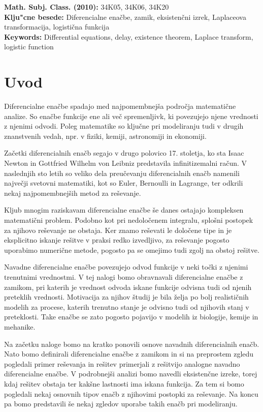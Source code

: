 \documentclass[12pt,a4paper]{amsart}
\theoremstyle{definition} %
\theoremstyle{plain} %
\begin{document}
\vfill\noindent
{\bf Math. Subj. Class. (2010):} 34K05, 34K06, 34K20  \\[1mm]  
{\bf Klju"cne besede:} Diferencialne enačbe, zamik, eksistenčni izrek, Laplaceova transformacija, logistična funkcija  \\[1mm]  
{\bf Keywords:} Dif\mbox{}ferential equations, delay, existence theorem, Laplace transform, logistic function
\pagebreak



\section{Uvod}

Diferencialne enačbe spadajo med najpomembnejša področja matematične analize. So enačbe funkcije ene ali več
spremenljivk, ki povezujejo njene vrednosti z njenimi odvodi. Poleg matematike so ključne pri modeliranju tudi v drugih
znanstvenih vedah, npr. v fiziki, kemiji, astronomiji in ekonomiji.

Začetki diferencialnih enačb segajo v drugo polovico 17. stoletja, ko sta Isaac Newton in Gottfried Wilhelm von 
Leibniz predstavila infinitizemalni račun. V naslednjih sto letih so veliko dela preučevanju diferencialnih
enačb namenili največji svetovni matematiki, kot so Euler, Bernoulli in Lagrange, ter odkrili nekaj najpomembnejših
metod za reševanje.

Kljub mnogim raziskavam diferencialne enačbe še danes ostajajo kompleksen matematični problem. Podobno kot pri
nedoločenem integralu, splošni postopek za njihovo reševanje ne obstaja. Ker znamo reševati le določene tipe in je
eksplicitno iskanje rešitve v praksi redko izvedljivo, za reševanje pogosto uporabimo numerične metode,
pogosto pa se omejimo tudi zgolj na obstoj rešitve.

Navadne diferencialne enačbe povezujejo odvod funkcije v neki točki z njenimi trenutnimi vrednostmi.
V tej nalogi bomo obravnavali diferencialne enačbe z zamikom, pri katerih je vrednost odvoda iskane funkcije odvisna
tudi od njenih preteklih vrednosti. Motivacija za njihov študij je bila želja po bolj realističnih modelih za procese, 
katerih trenutno stanje je odvisno tudi od njihovih stanj v preteklosti. Take enačbe se zato pogosto pojavijo v modelih
iz biologije, kemije in mehanike.

Na začetku naloge bomo na kratko ponovili osnove navadnih diferencialnih enačb. Nato bomo definirali
diferencialne enačbe z zamikom in si na preprostem zgledu pogledali primer reševanja in rešitev primerjali z 
rešitvijo analogne navadno diferencialne enačbe. V podrobnejši analizi bomo navedli eksistenčne izreke, torej kdaj 
rešitev obstaja ter kakšne lastnosti ima iskana funkcija. Za tem si bomo pogledali nekaj osnovnih tipov enačb z 
njihovimi postopki za reševanje. Na koncu pa bomo predstavili še nekaj zgledov uporabe takih enačb pri modeliranju.
\end{document}
